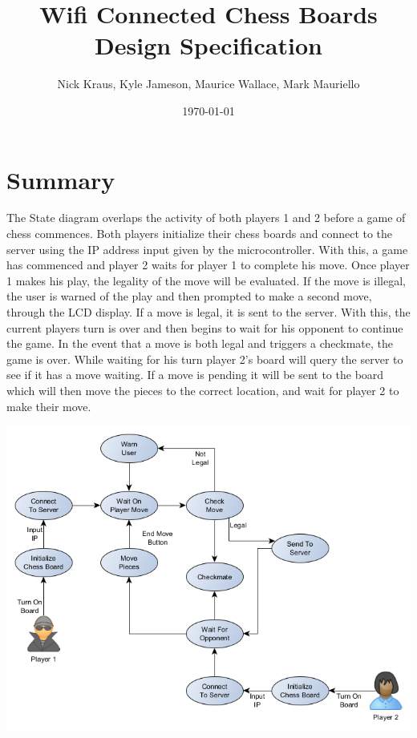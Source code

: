 \documentclass{article}
\title{Wifi Connected Chess Boards \\ \large Design Specification}
\author{Nick Kraus, Kyle Jameson, Maurice Wallace, Mark Mauriello}
\date{\today}
\begin{document}
\maketitle

\section*{Summary}
\indent

The State diagram overlaps the activity of both players 1 and 2 before a game of chess commences. Both players initialize their chess boards and connect to the server using the IP address input given by the microcontroller. With this, a game has commenced and player 2 waits for player 1 to complete his move. Once player 1 makes his play, the legality of the move will be evaluated. If the move is illegal, the user is warned of the play and then prompted to make a second move, through the LCD display. If a move is legal, it is sent to the server. With this, the current players turn is over and then begins to wait for his opponent to continue the game. In the event that a move is both legal and triggers a checkmate, the game is over. While waiting for his turn player 2's board will query the server to see if it has a move waiting. If a move is pending it will be sent to the board which will then move the pieces to the correct location, and wait for player 2 to make their move.

\vspace*{5mm}

\centerline{\includegraphics[scale=.5]{High_Level_State}}
\end{document}
